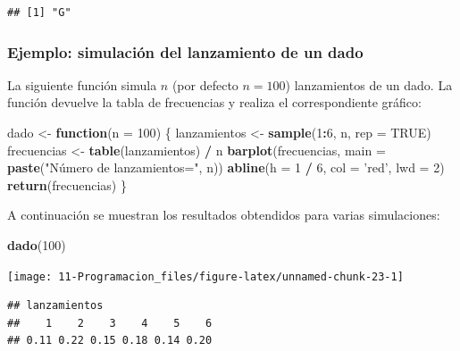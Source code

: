 \documentclass[]{book}
\newenvironment{Shaded}{\begin{snugshade}}{\end{snugshade}}
\newcommand{\KeywordTok}[1]{\textcolor[rgb]{0.13,0.29,0.53}{\textbf{#1}}}
\newcommand{\DataTypeTok}[1]{\textcolor[rgb]{0.13,0.29,0.53}{#1}}
\newcommand{\DecValTok}[1]{\textcolor[rgb]{0.00,0.00,0.81}{#1}}
\newcommand{\StringTok}[1]{\textcolor[rgb]{0.31,0.60,0.02}{#1}}
\newcommand{\OtherTok}[1]{\textcolor[rgb]{0.56,0.35,0.01}{#1}}
\newcommand{\ControlFlowTok}[1]{\textcolor[rgb]{0.13,0.29,0.53}{\textbf{#1}}}
\newcommand{\OperatorTok}[1]{\textcolor[rgb]{0.81,0.36,0.00}{\textbf{#1}}}
\newcommand{\NormalTok}[1]{#1}
\begin{document}
\begin{verbatim}
## [1] "G"
\end{verbatim}

\subsubsection{Ejemplo: simulación del lanzamiento de un
dado}\label{ejemplo-simulacion-del-lanzamiento-de-un-dado}

La siguiente función simula \(n\) (por defecto \(n=100\)) lanzamientos
de un dado. La función devuelve la tabla de frecuencias y realiza el
correspondiente gráfico:

\begin{Shaded}
\begin{Highlighting}[]
\NormalTok{dado <-}\StringTok{ }\ControlFlowTok{function}\NormalTok{(}\DataTypeTok{n =} \DecValTok{100}\NormalTok{) \{}
\NormalTok{  lanzamientos <-}\StringTok{ }\KeywordTok{sample}\NormalTok{(}\DecValTok{1}\OperatorTok{:}\DecValTok{6}\NormalTok{, n, }\DataTypeTok{rep =} \OtherTok{TRUE}\NormalTok{)}
\NormalTok{  frecuencias <-}\StringTok{ }\KeywordTok{table}\NormalTok{(lanzamientos) }\OperatorTok{/}\StringTok{ }\NormalTok{n}
  \KeywordTok{barplot}\NormalTok{(frecuencias, }\DataTypeTok{main =} \KeywordTok{paste}\NormalTok{(}\StringTok{"Número de lanzamientos="}\NormalTok{, n))}
  \KeywordTok{abline}\NormalTok{(}\DataTypeTok{h =} \DecValTok{1} \OperatorTok{/}\StringTok{ }\DecValTok{6}\NormalTok{, }\DataTypeTok{col =} \StringTok{'red'}\NormalTok{, }\DataTypeTok{lwd =} \DecValTok{2}\NormalTok{)}
  \KeywordTok{return}\NormalTok{(frecuencias)}
\NormalTok{\}}
\end{Highlighting}
\end{Shaded}

A continuación se muestran los resultados obtendidos para varias
simulaciones:

\begin{Shaded}
\begin{Highlighting}[]
\KeywordTok{dado}\NormalTok{(}\DecValTok{100}\NormalTok{)}
\end{Highlighting}
\end{Shaded}

\begin{center}\texttt{[image: 11-Programacion\_files/figure-latex/unnamed-chunk-23-1]} \end{center}

\begin{verbatim}
## lanzamientos
##    1    2    3    4    5    6 
## 0.11 0.22 0.15 0.18 0.14 0.20
\end{verbatim}
\end{document}
